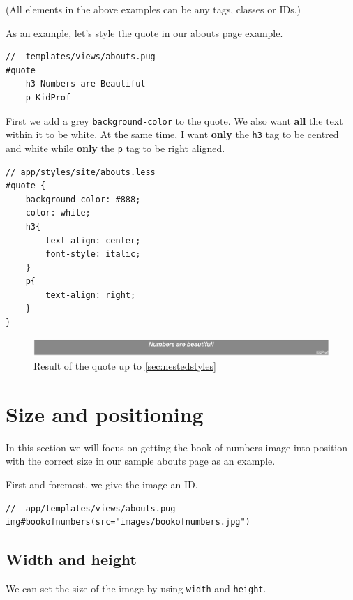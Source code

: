 (All elements in the above examples can be any tags, classes or IDs.)

As an example, let's style the quote in our abouts page example.

\begin{lstlisting}[language=pug]
//- templates/views/abouts.pug
#quote
    h3 Numbers are Beautiful
    p KidProf
\end{lstlisting}

First we add a grey \texttt{background-color} to the quote. We also want \textbf{all} the text within it to be white. At the same time, I want \textbf{only} the \texttt{h3} tag to be centred and white while \textbf{only} the \texttt{p} tag to be right aligned.

\begin{lstlisting}[language=pug]
// app/styles/site/abouts.less
#quote {
    background-color: #888;
    color: white;
    h3{
        text-align: center;
        font-style: italic;
    }
    p{
        text-align: right;
    }
}
\end{lstlisting}

\begin{figure}[h]
\centering
\includegraphics[width=15cm]{images/chn6-quote1.png}
\caption{Result of the quote up to \cref{sec:nestedstyles}}
\end{figure}


\section{Size and positioning}

In this section we will focus on getting the book of numbers image into position with the correct size in our sample abouts page as an example. 

First and foremost, we give the image an ID. 

\begin{lstlisting}
//- app/templates/views/abouts.pug
img#bookofnumbers(src="images/bookofnumbers.jpg")
\end{lstlisting}

\subsection{Width and height}
\label{sec:width}

We can set the size of the image by using \texttt{width} and \texttt{height}.

